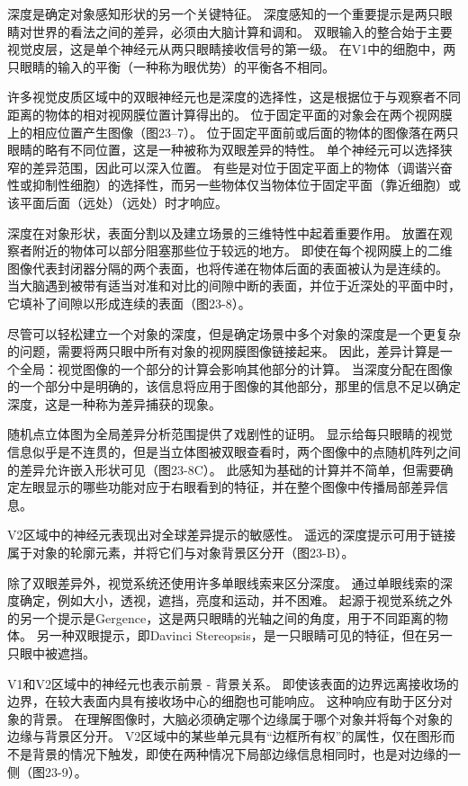 深度是确定对象感知形状的另一个关键特征。 深度感知的一个重要提示是两只眼睛对世界的看法之间的差异，必须由大脑计算和调和。 双眼输入的整合始于主要视觉皮层，这是单个神经元从两只眼睛接收信号的第一级。 在V1中的细胞中，两只眼睛的输入的平衡（一种称为眼优势）的平衡各不相同。

许多视觉皮质区域中的双眼神经元也是深度的选择性，这是根据位于与观察者不同距离的物体的相对视网膜位置计算得出的。 位于固定平面的对象会在两个视网膜上的相应位置产生图像（图23–7）。 位于固定平面前或后面的物体的图像落在两只眼睛的略有不同位置，这是一种被称为双眼差异的特性。 单个神经元可以选择狭窄的差异范围，因此可以深入位置。 有些是对位于固定平面上的物体（调谐兴奋性或抑制性细胞）的选择性，而另一些物体仅当物体位于固定平面（靠近细胞）或该平面后面（远处）（远处）时才响应。

深度在对象形状，表面分割以及建立场景的三维特性中起着重要作用。 放置在观察者附近的物体可以部分阻塞那些位于较远的地方。 即使在每个视网膜上的二维图像代表封闭器分隔的两个表面，也将传递在物体后面的表面被认为是连续的。 当大脑遇到被带有适当对准和对比的间隙中断的表面，并位于近深处的平面中时，它填补了间隙以形成连续的表面（图23-8）。

尽管可以轻松建立一个对象的深度，但是确定场景中多个对象的深度是一个更复杂的问题，需要将两只眼中所有对象的视网膜图像链接起来。 因此，差异计算是一个全局：视觉图像的一个部分的计算会影响其他部分的计算。 当深度分配在图像的一个部分中是明确的，该信息将应用于图像的其他部分，那里的信息不足以确定深度，这是一种称为差异捕获的现象。

随机点立体图为全局差异分析范围提供了戏剧性的证明。 显示给每只眼睛的视觉信息似乎是不连贯的，但是当立体图被双眼查看时，两个图像中的点随机阵列之间的差异允许嵌入形状可见（图23-8C）。 此感知为基础的计算并不简单，但需要确定左眼显示的哪些功能对应于右眼看到的特征，并在整个图像中传播局部差异信息。

V2区域中的神经元表现出对全球差异提示的敏感性。 遥远的深度提示可用于链接属于对象的轮廓元素，并将它们与对象背景区分开（图23-B）。

除了双眼差异外，视觉系统还使用许多单眼线索来区分深度。 通过单眼线索的深度确定，例如大小，透视，遮挡，亮度和运动，并不困难。 起源于视觉系统之外的另一个提示是Gergence，这是两只眼睛的光轴之间的角度，用于不同距离的物体。 另一种双眼提示，即Davinci Stereopsis，是一只眼睛可见的特征，但在另一只眼中被遮挡。

V1和V2区域中的神经元也表示前景 - 背景关系。 即使该表面的边界远离接收场的边界，在较大表面内具有接收场中心的细胞也可能响应。 这种响应有助于区分对象的背景。 在理解图像时，大脑必须确定哪个边缘属于哪个对象并将每个对象的边缘与背景区分开。 V2区域中的某些单元具有“边框所有权”的属性，仅在图形而不是背景的情况下触发，即使在两种情况下局部边缘信息相同时，也是对边缘的一侧（图23-9）。


